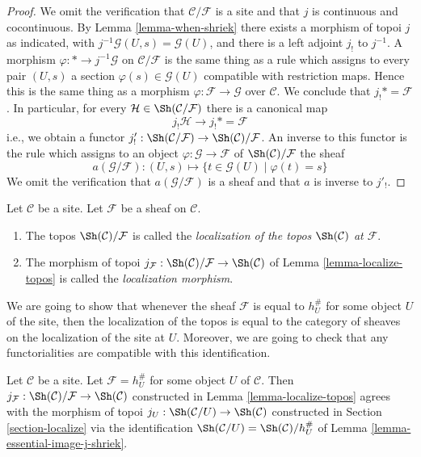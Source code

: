 \begin{proof}
We omit the verification that $\mathcal{C}/\mathcal{F}$ is a site and
that $j$ is continuous and cocontinuous. By
Lemma \ref{lemma-when-shriek} there exists a morphism of topoi
$j$ as indicated, with $j^{-1}\mathcal{G}(U, s) = \mathcal{G}(U)$,
and there is a left adjoint $j_!$ to $j^{-1}$. A morphism
$\varphi : * \to j^{-1}\mathcal{G}$ on $\mathcal{C}/\mathcal{F}$
is the same thing as a rule which assigns to every pair $(U, s)$ a
section $\varphi(s) \in \mathcal{G}(U)$ compatible with restriction maps.
Hence this is the same thing as a morphism
$\varphi : \mathcal{F} \to \mathcal{G}$ over $\mathcal{C}$.
We conclude that $j_!* = \mathcal{F}$. In particular, for every
$\mathcal{H} \in \Sh(\mathcal{C}/\mathcal{F})$ there is a canonical map
$$
j_!\mathcal{H} \to j_!* = \mathcal{F}
$$
i.e., we obtain a functor
$j'_! : \Sh(\mathcal{C}/\mathcal{F}) \to \Sh(\mathcal{C})/\mathcal{F}$.
An inverse to this functor is the rule which assigns to an object
$\varphi : \mathcal{G} \to \mathcal{F}$ of $\Sh(\mathcal{C})/\mathcal{F}$ the
sheaf
$$
a(\mathcal{G}/\mathcal{F}) :
(U, s) \longmapsto \{t \in \mathcal{G}(U) \mid \varphi(t) = s\}
$$
We omit the verification that $a(\mathcal{G}/\mathcal{F})$ is a sheaf
and that $a$ is inverse to $j'_!$.
\end{proof}

\begin{definition}
\label{definition-localize-topos}
Let $\mathcal{C}$ be a site.
Let $\mathcal{F}$ be a sheaf on $\mathcal{C}$.
\begin{enumerate}
\item The topos $\Sh(\mathcal{C})/\mathcal{F}$
is called the
{\it localization of the topos $\Sh(\mathcal{C})$ at $\mathcal{F}$}.
\item The morphism of topoi
$j_\mathcal{F} :
\Sh(\mathcal{C})/\mathcal{F}
\to
\Sh(\mathcal{C})$ of
Lemma \ref{lemma-localize-topos}
is called the {\it localization morphism}.
\end{enumerate}
\end{definition}

\noindent
We are going to show that whenever the sheaf $\mathcal{F}$ is equal to
$h_U^\#$ for some object $U$ of the site, then the localization of the
topos is equal to the category of sheaves on the localization of the site
at $U$. Moreover, we are going to check that any functorialities are
compatible with this identification.

\begin{lemma}
\label{lemma-localize-compare}
Let $\mathcal{C}$ be a site. Let $\mathcal{F} = h_U^\#$ for some object $U$
of $\mathcal{C}$. Then $j_\mathcal{F} : \Sh(\mathcal{C})/\mathcal{F}
\to \Sh(\mathcal{C})$ constructed in
Lemma \ref{lemma-localize-topos}
agrees with the morphism of topoi
$j_U : \Sh(\mathcal{C}/U) \to \Sh(\mathcal{C})$
constructed in
Section \ref{section-localize}
via the identification
$\Sh(\mathcal{C}/U) = \Sh(\mathcal{C})/h_U^\#$
of
Lemma \ref{lemma-essential-image-j-shriek}.
\end{lemma}

